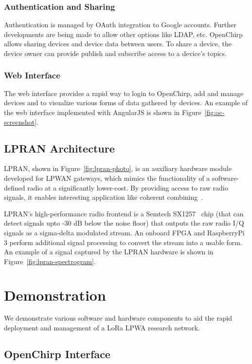 \documentclass[conference]{IEEEtran}
\newcommand{\figref}[1]{Figure~\ref{fig:#1}}
\begin{document}
\subsubsection{Authentication and Sharing}

Authentication is managed by OAuth integration to Google accounts. Further
developments are being made to allow other options like LDAP, etc. OpenChirp
allows sharing devices and device data between users. To share a device, the
device owner can provide publish and subscribe access to a device's topics.

\subsubsection{Web Interface}

The web interface provides a rapid way to login to OpenChirp, add and manage
devices and to visualize various forms of data gathered by devices. An example
of the web interface implemented with AngularJS is shown in
\figref{oc-screenshot}.

\subsection{LPRAN Architecture}
\label{sec:lpran-arch}

LPRAN, shown in \figref{lpran-photo}, is an auxiliary hardware module
developed for LPWAN gateways, which mimics the functionality of a
software-defined radio at a significantly lower-cost. By providing access to
raw radio signals, it enables interesting application like coherent
combining~\cite{charm2018underreview}.

LPRAN's high-performance radio frontend is a Semtech SX1257~\cite{sx1257} chip
(that can detect signals upto -30 dB below the noise floor) that outputs the raw radio I/Q
signals as a sigma-delta modulated stream. An onboard FPGA and RaspberryPi 3
perform additional signal processing to convert the stream into a usable form.
An example of a signal captured by the LPRAN hardware is shown in
\figref{lpran-spectrogram}.

\section{Demonstration}
\label{sec:demo}

We demonstrate various software and hardware components to aid the rapid
deployment and management of a LoRa LPWA research network.

\subsection{OpenChirp Interface}
\label{sec:oc-interface-demo}
\end{document}
